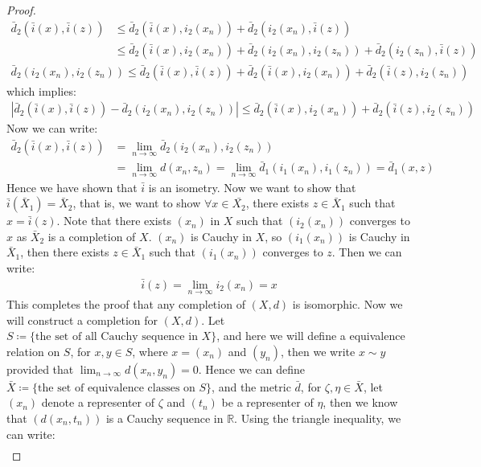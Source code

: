 \documentclass[11pt]{book}
\theoremstyle{break}
\theoremstyle{break}
\newcommand{\R}{\mathbb{R}}
\begin{document}
\begin{proof}
\begin{align*}
\bar{d}_2(\bar{i}(x), \bar{i}(z)) &\leq \bar{d}_2(\bar{i}(x), i_2(x_n)) + \bar{d}_2 (i_2(x_n), \bar{i}(z)) \\
&\leq \bar{d}_2(\bar{i}(x), i_2(x_n)) + \bar{d}_2(i_2(x_n), i_2(z_n)) + \bar{d}_2(i_2(z_n), \bar{i}(z))
\end{align*}
\begin{align*}
\bar{d}_2(i_2(x_n), i_2(z_n)) \leq \bar{d}_2 (\bar{i}(x),\bar{i}(z)) + \bar{d}_2(\bar{i}(x), i_2(x_n)) + \bar{d}_2(\bar{i}(z), i_2(z_n))
\end{align*}
which implies:
\begin{align*}
\left| \bar{d}_2(\bar{i}(x),\bar{i}(z)) - \bar{d}_2(i_2(x_n),i_2(z_n)) \right| \leq \bar{d}_2(\bar{i}(x), i_2(x_n)) + \bar{d}_2(\bar{i}(z), i_2(z_n))
\end{align*}
Now we can write:
\begin{align*}
\bar{d}_2 (\bar{i}(x), \bar{i}(z)) &= \lim_{n\to \infty}\bar{d}_2(i_2(x_n), i_2(z_n))\\
&= \lim_{n\to \infty}d(x_n,z_n) = \lim_{n\to \infty} \bar{d}_1 (i_1(x_n), i_1(z_n)) = \bar{d}_1(x,z)
\end{align*}
Hence we have shown that $\bar{i}$ is an isometry. Now we want to show that $\bar{i}(\bar{X}_1) = \bar{X}_2$, that is, we want to show $\forall x \in \bar{X_2}$, there exists $z \in \bar{X}_1$ such that $x = \bar{i}(z)$. Note that there exists $(x_n)$ in $X$ such that $(i_2(x_n))$ converges to $x$ as $\bar{X}_2$ is a completion of $X$. $(x_n)$ is Cauchy in $X$, so $(i_1(x_n))$ is Cauchy in $\bar{X}_1$, then there exists $z \in \bar{X}_1$ such that $(i_1(x_n))$ converges to $z$. Then we can write:
\begin{align*}
\bar{i}(z) = \lim_{n\to \infty} i_2(x_n) = x
\end{align*}
This completes the proof that any completion of $(X,d)$ is isomorphic. Now we will construct a completion for $(X,d)$. Let $S \coloneqq \{\text{the set of all Cauchy sequence in }X\}$, and here we will define a equivalence relation on $S$, for $x,y \in S$, where $x=(x_n)$ and $(y_n)$, then we write $x \sim y$ provided that $\lim_{n\to \infty}d(x_n,y_n) = 0$. Hence we can define $\bar{X} \coloneqq \{\text{the set of equivalence classes on }S\}$, and the metric $\bar{d}$, for $\zeta,\eta \in \bar{X}$, let $(x_n)$ denote a representer of $\zeta$ and $(t_n)$ be a representer of $\eta$, then we know that $(d(x_n,t_n))$ is a Cauchy sequence in $\R$. Using the triangle inequality, we can write:
\begin{align*}

\end{align*}
\end{proof}
\end{document}
